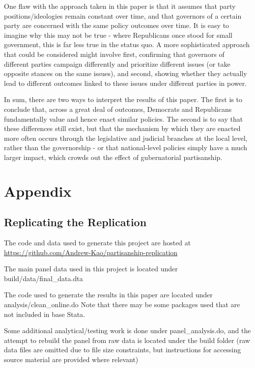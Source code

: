 \documentclass{article}
\begin{document}
One flaw with the approach taken in this paper is that it assumes that party positions/ideologies remain constant over time, and that governors of a certain party are concerned with the same policy outcomes over time. It is easy to imagine why this may not be true - where Republicans once stood for small government, this is far less true in the status quo. A more sophisticated approach that could be considered might involve first, confirming that governors of different parties campaign differently and prioritize different issues (or take opposite stances on the same issues), and second, showing whether they actually lead to different outcomes linked to these issues under different parties in power.

In sum, there are two ways to interpret the results of this paper. The first is to conclude that, across a great deal of outcomes, Democrats and Republicans fundamentally value and hence enact similar policies. The second is to say that these differences still exist, but that the mechanism by which they are enacted more often occurs through the legislative and judicial branches at the local level, rather than the governorship - or that national-level policies simply have a much larger impact, which crowds out the effect of gubernatorial partisanship. 


\section{Appendix}

\subsection{Replicating the Replication}

The code and data used to generate this project are hosted at \url{https://github.com/Andrew-Kao/partisanship-replication}

The main panel data used in this project is located under build/data/final\_data.dta

The code used to generate the results in this paper are located under analysis/clean\_online.do    Note that there may be some packages used that are not included in base Stata. 

Some additional analytical/testing work is done under panel\_analysis.do, and the attempt to rebuild the panel from raw data is located under the build folder (raw data files are omitted due to file size constraints, but instructions for accessing source material are provided where relevant)
\end{document}
